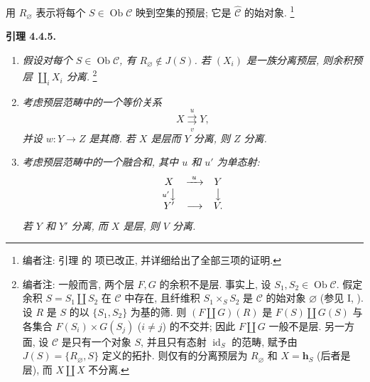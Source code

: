 
\setcounter{footnote}{31}

用 \(R_{\varnothing}\) 表示将每个 \(S\in\operatorname{Ob}\mathscr C\)
映到空集的预层; 它是 \(\widehat{\mathscr C}\) 的始对象.
\footnote{编者注: 引理 
的  项已改正,
并详细给出了全部三项的证明.}

\medskip
\noindent{}\textbf{引理 4.4.5.}
\begin{enumerate}
  \item[(i)]
    \textit{假设对每个 \(S\in\operatorname{Ob}\mathscr C\), 有
    \(R_{\varnothing}\notin J(S)\). 若 \((X_i)\) 是一族分离预层,
    则余积预层 \(\coprod_i X_i\) 分离.}
    \footnote{编者注: 一般而言, 两个层 \(F,G\) 的余积不是层.
    事实上, 设 \(S_1,S_2\in\operatorname{Ob}\mathscr C\).
    假定余积 \(S=S_1\coprod S_2\) 在 \(\mathscr C\) 中存在,
    且纤维积 \(S_1\times_S S_2\) 是 \(\mathscr C\) 的始对象
    \(\varnothing\) (参见 I, ).
    设 \(R\) 是 \(S\) 的以 \(\{S_1,S_2\}\) 为基的筛.
    则 \((F\coprod G)(R)\) 是 \(F(S)\coprod G(S)\)
    与各集合 \(F(S_i)\times G(S_j)\) (\(i\ne j\)) 的不交并;
    因此 \(F\coprod G\) 一般不是层. 另一方面, 设 \(\mathscr C\)
    是只有一个对象 \(S\), 并且只有态射 \(\operatorname{id}_S\) 的范畴,
    赋予由 \(J(S)=\{R_{\varnothing},S\}\) 定义的拓扑.
    则仅有的分离预层为 \(R_{\varnothing}\) 和 \(X=\mathbf h_S\)
    (后者是层), 而 \(X\coprod X\) 不分离.}

  \item[(ii)]
    \textit{考虑预层范畴中的一个等价关系}
    \[
      X\overset{u}{\underset{v}{\rightrightarrows}}Y,
    \]
    \textit{并设 \(w:Y\to Z\) 是其商. 若 \(X\) 是层而
    \(Y\) 分离, 则 \(Z\) 分离.}

  \item[(iii)]
    \textit{考虑预层范畴中的一个融合和, 其中 \(u\) 和 \(u'\) 为单态射:}
    \[
    \begin{array}{ccc}
      X & \xrightarrow{\ u\ } & Y\\
      {\scriptstyle u'}\big\downarrow && \big\downarrow\\
      Y' & \longrightarrow & V.
    \end{array}
    \]
    \textit{若 \(Y\) 和 \(Y'\) 分离, 而 \(X\) 是层,
    则 \(V\) 分离.}
\end{enumerate}

